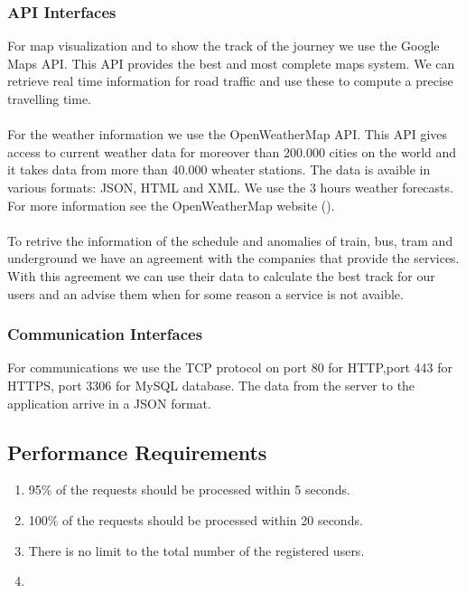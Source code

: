 \subsubsection{API Interfaces}
For map visualization and to show the track of the journey we use the Google Maps API. This API provides the best and most complete maps system. We can retrieve real time information for road traffic and use these to compute a precise travelling time.\\\\
For the weather information we use the OpenWeatherMap API. This API gives access to current weather data for moreover than 200.000 cities on the world and it takes data from more than 40.000 wheater stations. The data is avaible in various formats: JSON, HTML and XML. We use the 3 hours weather forecasts. For more information see the OpenWeatherMap website ({\href{http://openweathermap.org/api}{\color{Black}{http://openweathermap.org/api}}}).
\\\\
To retrive the information of the schedule and anomalies of train, bus, tram and underground we have an agreement with the companies that provide the services. With this agreement we can use their data to calculate the best track for our users and an advise them when for some reason a service is not avaible.

\subsubsection{Communication Interfaces}
For communications we use the TCP protocol on port 80 for HTTP,port 443 for HTTPS, port 3306 for MySQL database. The data from the server to the application arrive in a JSON format.





\subsection{Performance Requirements}
\begin{enumerate}
\item
95\% of the requests should be processed within 5 seconds.
\item
100\% of the requests should be processed within 20 seconds.
\item
There is no limit to the total number of the registered users.
\item

\end{enumerate}

